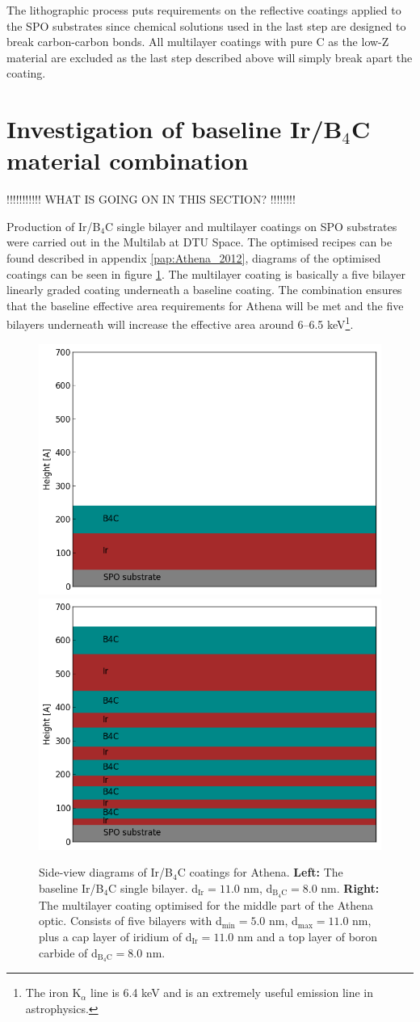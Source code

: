 The lithographic process puts requirements on the reflective coatings applied to the SPO substrates since chemical solutions used in the last step are designed to break carbon-carbon bonds. All multilayer coatings with pure C as the low-Z material are excluded as the last step described above will simply break apart the coating.

\section{Investigation of baseline Ir/B$_4$C material combination}
!!!!!!!!!!! WHAT IS GOING ON IN THIS SECTION? !!!!!!!!

Production of Ir/B$_4$C single bilayer and multilayer coatings on SPO substrates were carried out in the Multilab at DTU Space. The optimised recipes can be found described in appendix \ref{pap:Athena_2012}, diagrams of the optimised coatings can be seen in figure \ref{fig:ml_baseline_sideview}. The multilayer coating is basically a five bilayer linearly graded coating underneath a baseline coating. The combination ensures that the baseline effective area requirements for Athena will be met and the five bilayers underneath will increase the effective area around 6--6.5 keV\footnote{The iron K$_{\alpha}$ line is 6.4 keV and is an extremely useful emission line in astrophysics.}.

\begin{figure}[!h]
  \center
\includegraphics[width=0.4\linewidth]{figures/athena/coating_on_spo/ir-b4c-baseline.png}
  \includegraphics[width=0.4\linewidth]{figures/athena/coating_on_spo/ir-b4c-ml.png}
\caption{\footnotesize Side-view diagrams of Ir/B$_4$C coatings for Athena. \textbf{Left:} The baseline Ir/B$_4$C single bilayer. d$_{\text{Ir}} = 11.0$ nm,  d$_{\text{B}_4\text{C}} = 8.0$ nm. \textbf{Right:} The multilayer coating optimised for the middle part of the Athena optic. Consists of five bilayers with d$_{\text{min}} = 5.0$ nm, d$_{\text{max}} = 11.0$ nm, plus a cap layer of iridium of d$_{\text{Ir}} = 11.0$ nm and a top layer of boron carbide of d$_{\text{B}_4\text{C}} = 8.0$ nm. }\label{fig:ml_baseline_sideview}
\end{figure}

